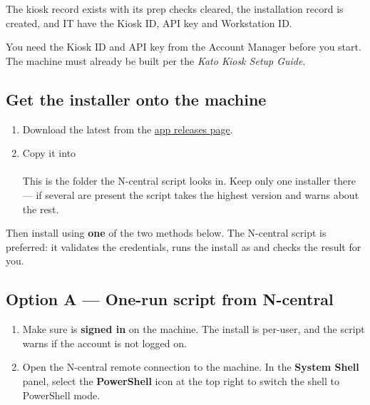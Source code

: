 \documentclass[a4paper,10pt]{article}
\begin{document}

\begin{wkinfo}
The kiosk record exists with its prep checks cleared, the installation
record is created, and IT have the Kiosk ID, API key and Workstation ID.
\end{wkinfo}


You need the Kiosk ID and API key from the Account Manager before you
start. The machine must already be built per the \emph{Kato Kiosk Setup
Guide}.

\subsection{Get the installer onto the machine}

\begin{enumerate}
  \item Download the latest  from the
        \href{https://github.com/WeKnowTechnology/wkg-electron-app/releases}{app
        releases page}.

  \item Copy it into\\
        \\
        This is the folder the N-central script looks in. Keep only one
        installer there --- if several are present the script takes the
        highest version and warns about the rest.
\end{enumerate}

Then install using \textbf{one} of the two methods below. The N-central
script is preferred: it validates the credentials, runs the install as
 and checks the result for you.

\subsection{Option A --- One-run script from N-central}\label{sec:ncentral}

\begin{enumerate}
  \item Make sure  is \textbf{signed in} on the machine.
        The install is per-user, and the script warns if the account is not
        logged on.

  \item Open the N-central remote connection to the machine. In the
        \textbf{System Shell} panel, select the \textbf{PowerShell} icon at
        the top right to switch the shell to PowerShell mode.
\end{enumerate}
\end{document}
